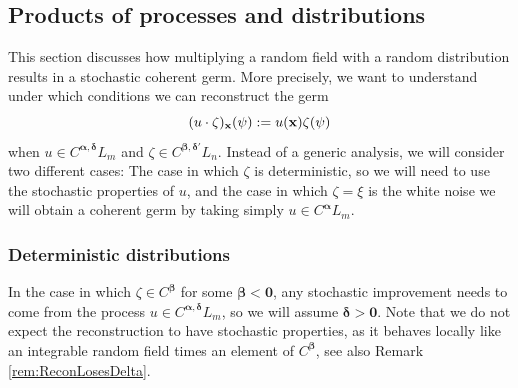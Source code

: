 \documentclass[12pt]{article}
\numberwithin{equation}{section}
\theoremstyle{plain}
\theoremstyle{definition}
\def\falpha{{\boldsymbol\alpha}}
\def\fbeta{{\boldsymbol\beta}}
\def\fdelta{{\boldsymbol\delta}}
\def\foo{{\boldsymbol 0}}
\begin{document}
\subsection{Products of processes and distributions}

This section discusses how multiplying a random field with a random distribution results in a stochastic coherent germ. More precisely, we want to understand under which conditions we can reconstruct the germ
\begin{equation}\label{eq:product}
    (u\cdot \zeta)_{\fx}(\psi):= u(\fx)\zeta(\psi)
\end{equation}
when $u\in C^{\falpha, \fdelta} L_m$ and $\zeta\in C^{\fbeta, \fdelta'} L_n$. Instead of a generic analysis, we will consider two different cases: The case in which $\zeta$ is deterministic, so we will need to use  the stochastic properties of $u$, and the case in which $\zeta = \xi$ is the  white noise we will obtain a coherent germ by taking simply  $u\in C^{\falpha} L_m$.

\subsubsection*{Deterministic distributions}\label{sec:productandrecon}

In the case in which $\zeta\in C^\fbeta$  for some $\fbeta<\foo$, any stochastic improvement needs to come from the process $u\in C^{\falpha,\fdelta}L_m$, so we will assume $\fdelta>\foo$. Note that we do not expect the reconstruction to have stochastic properties, as it behaves locally like an integrable random field times an element of $C^\fbeta$, see also Remark \ref{rem:ReconLosesDelta}. 
\end{document}
